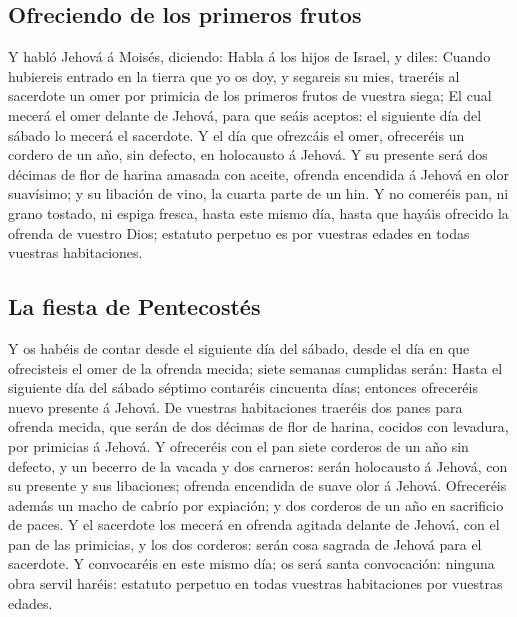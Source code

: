 \hypertarget{ofreciendo-de-los-primeros-frutos}{%
\subsection{Ofreciendo de los primeros
frutos}\label{ofreciendo-de-los-primeros-frutos}}

 Y habló Jehová á Moisés, diciendo:  Habla
á los hijos de Israel, y diles: Cuando hubiereis entrado en la tierra
que yo os doy, y segareis su mies, traeréis al sacerdote un omer por
primicia de los primeros frutos de vuestra siega;  El
cual mecerá el omer delante de Jehová, para que seáis aceptos: el
siguiente día del sábado lo mecerá el sacerdote.  Y el
día que ofrezcáis el omer, ofreceréis un cordero de un año, sin defecto,
en holocausto á Jehová.  Y su presente será dos décimas
de flor de harina amasada con aceite, ofrenda encendida á Jehová en olor
suavísimo; y su libación de vino, la cuarta parte de un hin.
 Y no comeréis pan, ni grano tostado, ni espiga fresca,
hasta este mismo día, hasta que hayáis ofrecido la ofrenda de vuestro
Dios; estatuto perpetuo es por vuestras edades en todas vuestras
habitaciones.

\hypertarget{la-fiesta-de-pentecostuxe9s}{%
\subsection{La fiesta de
Pentecostés}\label{la-fiesta-de-pentecostuxe9s}}

 Y os habéis de contar desde el siguiente día del sábado,
desde el día en que ofrecisteis el omer de la ofrenda mecida; siete
semanas cumplidas serán:  Hasta el siguiente día del
sábado séptimo contaréis cincuenta días; entonces ofreceréis nuevo
presente á Jehová.  De vuestras habitaciones traeréis dos
panes para ofrenda mecida, que serán de dos décimas de flor de harina,
cocidos con levadura, por primicias á Jehová.  Y
ofreceréis con el pan siete corderos de un año sin defecto, y un becerro
de la vacada y dos carneros: serán holocausto á Jehová, con su presente
y sus libaciones; ofrenda encendida de suave olor á Jehová.
 Ofreceréis además un macho de cabrío por expiación; y
dos corderos de un año en sacrificio de paces.  Y el
sacerdote los mecerá en ofrenda agitada delante de Jehová, con el pan de
las primicias, y los dos corderos: serán cosa sagrada de Jehová para el
sacerdote.  Y convocaréis en este mismo día; os será
santa convocación: ninguna obra servil haréis: estatuto perpetuo en
todas vuestras habitaciones por vuestras edades.

